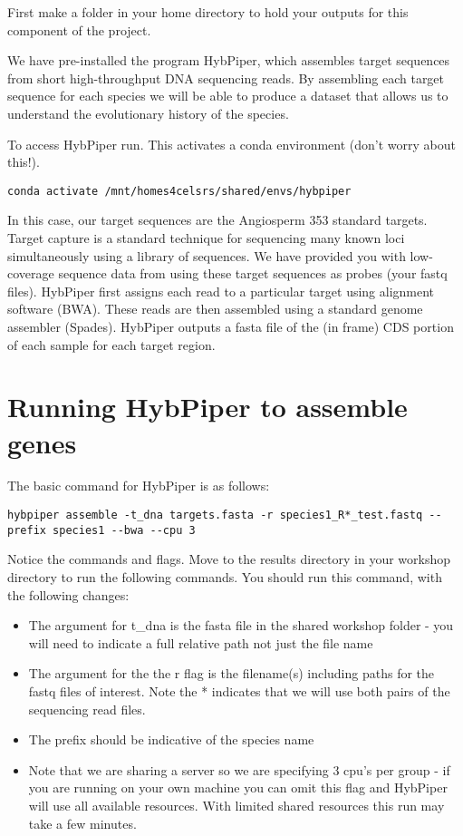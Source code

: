 \documentclass[
]{book}
\providecommand{\tightlist}{%
  \setlength{\itemsep}{0pt}\setlength{\parskip}{0pt}}
\begin{document}
First make a folder in your home directory to hold your outputs for this component of the project.

We have pre-installed the program HybPiper, which assembles target sequences from short high-throughput DNA sequencing reads.
By assembling each target sequence for each species we will be able to produce a dataset that allows us to understand the evolutionary history of the species.

To access HybPiper run.
This activates a conda environment (don't worry about this!).

\begin{verbatim}
conda activate /mnt/homes4celsrs/shared/envs/hybpiper
\end{verbatim}

In this case, our target sequences are the Angiosperm 353 standard targets.
Target capture is a standard technique for sequencing many known loci simultaneously using a library of sequences.
We have provided you with low-coverage sequence data from using these target sequences as probes (your fastq files).
HybPiper first assigns each read to a particular target using alignment software (BWA).
These reads are then assembled using a standard genome assembler (Spades).
HybPiper outputs a fasta file of the (in frame) CDS portion of each sample for each target region.

\hypertarget{running-hybpiper-to-assemble-genes}{%
\section{Running HybPiper to assemble genes}\label{running-hybpiper-to-assemble-genes}}

The basic command for HybPiper is as follows:

\begin{verbatim}
hybpiper assemble -t_dna targets.fasta -r species1_R*_test.fastq --prefix species1 --bwa --cpu 3
\end{verbatim}

Notice the commands and flags.
Move to the results directory in your workshop directory to run the following commands.
You should run this command, with the following changes:

\begin{itemize}
\tightlist
\item
  The argument for t\_dna is the fasta file in the shared workshop folder - you will need to indicate a full relative path not just the file name
\item
  The argument for the the r flag is the filename(s) including paths for the fastq files of interest. Note the * indicates that we will use both pairs of the sequencing read files.
\item
  The prefix should be indicative of the species name
\item
  Note that we are sharing a server so we are specifying 3 cpu's per group - if you are running on your own machine you can omit this flag and HybPiper will use all available resources. With limited shared resources this run may take a few minutes.
\end{itemize}
\end{document}
